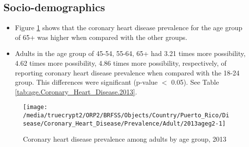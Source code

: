 
\newpage
\subsection{Socio-demographics}

\begin{itemize}

\item Figure \ref{fig:age.Coronary_Heart_Disease.2013} shows that the coronary heart disease prevalence for the age group of
65+
was higher when compared with the other groups.

\item Adults in the age group of 45-54, 55-64, 65+ had 3.21 times more possibility, 4.62 times more possibility, 4.86 times more possibility, respectively, of reporting coronary heart disease prevalence when compared with the 18-24 group. This differences were significant (p-value $<$ 0.05). See Table \ref{tab:age.Coronary_Heart_Disease.2013}.


\end{itemize}


\begin{figure}[H]
\caption{Coronary heart disease prevalence among adults by age group, 
2013}
\begin{knitrout}
\color{fgcolor}

{\centering \texttt{[image: /media/truecrypt2/ORP2/BRFSS/Objects/Country/Puerto\_Rico/Disease/Coronary\_Heart\_Disease/Prevalence/Adult/2013ageg2-1]} 

}



\end{knitrout}
\label{fig:age.Coronary_Heart_Disease.2013}
\end{figure}

